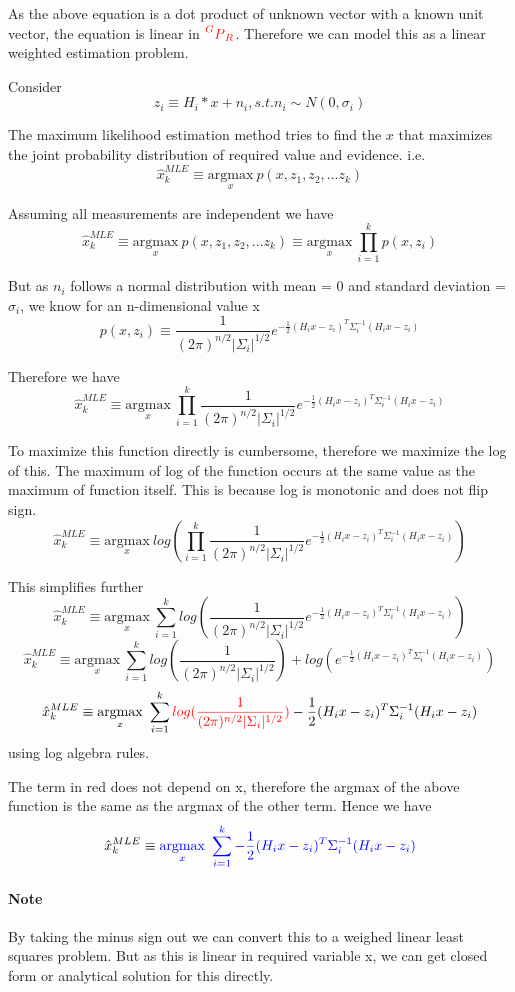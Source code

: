 \documentclass[12pt]{article}
\newcommand{\rxpy}[2]{{\color{red} \prescript{#1}{}{P}_{#2}}}
\newcommand{\xmle}{\hat{x}^{MLE}_k}
\newcommand{\amax}{\underset{x}{\mathrm{argmax}}}
\begin{document}
As the above equation is a dot product of unknown vector with a known unit vector, the equation is linear in $ \rxpy{G}{R} $.
Therefore we can model this as a linear weighted estimation problem.

Consider
\[
  z_i \equiv H_i * x + n_i, s.t. n_i \sim N(0, \sigma_i)
\]

The maximum likelihood estimation method tries to find the $x$ that maximizes the joint probability distribution of required value and evidence. i.e.
\[
  \xmle \equiv \amax\ p(x, z_1, z_2, ... z_k)
\]

Assuming all measurements are independent we have
\[
  \xmle \equiv \amax\ p(x, z_1, z_2, ... z_k) \equiv \amax\ \prod_{i=1}^{k} p(x, z_i)
\]

But as $n_i$ follows a normal distribution with mean = 0 and standard deviation = $\sigma_i$, we know for an n-dimensional value x
\[
  p(x, z_i) \equiv \frac{1}{(2\pi)^{n/2}|\Sigma_i|^{1/2}} e^{-\frac{1}{2} (H_ix - z_i)^T\Sigma_i^{-1}(H_ix - z_i)}
\]

Therefore we have
\[
  \xmle \equiv \amax\ \prod_{i=1}^{k} \frac{1}{(2\pi)^{n/2}|\Sigma_i|^{1/2}} e^{-\frac{1}{2} (H_ix - z_i)^T\Sigma_i^{-1}(H_ix - z_i)}
\]

To maximize this function directly is cumbersome, therefore we maximize the log of this.
The maximum of log of the function occurs at the same value as the maximum of function itself.
This is because log is monotonic and does not flip sign.
\[
  \xmle \equiv \amax\ log(\prod_{i=1}^{k} \frac{1}{(2\pi)^{n/2}|\Sigma_i|^{1/2}} e^{-\frac{1}{2} (H_ix - z_i)^T\Sigma_i^{-1}(H_ix - z_i)})
\]

This simplifies further
\[
  \xmle \equiv \amax\ \sum_{i=1}^{k} log(\frac{1}{(2\pi)^{n/2}|\Sigma_i|^{1/2}} e^{-\frac{1}{2} (H_ix - z_i)^T\Sigma_i^{-1}(H_ix - z_i)})
\]
\[
  \xmle \equiv \amax\ \sum_{i=1}^{k} log(\frac{1}{(2\pi)^{n/2}|\Sigma_i|^{1/2}}) + log(e^{-\frac{1}{2} (H_ix - z_i)^T\Sigma_i^{-1}(H_ix - z_i)})
\]
\[
  \xmle \equiv \amax\ \sum_{i=1}^{k} {\color{red} log(\frac{1}{(2\pi)^{n/2}|\Sigma_i|^{1/2}})} -\frac{1}{2} (H_ix - z_i)^T\Sigma_i^{-1}(H_ix - z_i)
\]
using log algebra rules.

The term in red does not depend on x, therefore the argmax of the above function is the same as the argmax of the other term.
Hence we have
\[
  \xmle \equiv {\color{blue} \amax\ \sum_{i=1}^{k} -\frac{1}{2} (H_ix - z_i)^T\Sigma_i^{-1}(H_ix - z_i)}
\]

\paragraph{Note}
By taking the minus sign out we can convert this to a weighed linear least squares problem.
But as this is linear in required variable x, we can get closed form or analytical solution for this directly.
\end{document}
